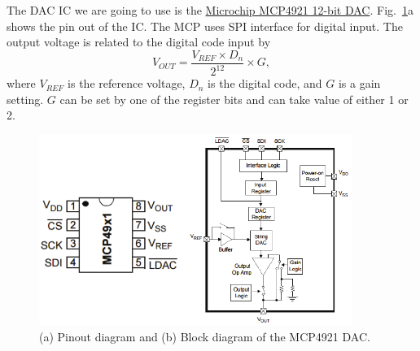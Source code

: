 \documentclass[letterpaper, 11pt]{article}
\begin{document}
The DAC IC we are going to use is the \href{http://www.microchip.com/wwwproducts/Devices.aspx?product=MCP4921}{Microchip MCP4921 12-bit DAC}. Fig.~\ref{fig:mcp4921}a shows the pin out of the IC. The MCP uses SPI interface for digital input. The output voltage is related to the digital code input by
\[
	V_{OUT} = \frac{V_{REF} \times D_n}{2^{12}} \times G,
\]
where $V_{REF}$ is the reference voltage, $D_n$ is the digital code, and $G$ is a gain setting. $G$ can be set by one of the register bits and can take value of either 1 or 2. 


	\begin{figure}[h]
		\centering
		\includegraphics[width=4in]{mcp4921}
		\caption{(a) Pinout diagram and (b) Block diagram of the MCP4921 DAC.}
		\label{fig:mcp4921}
	\end{figure}
\end{document}
